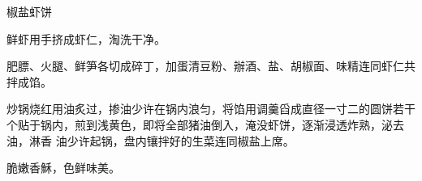 \begin{recipe}{椒盐虾饼}

\ingredients


\preparation

\step 鲜虾用手挤成虾仁，淘洗干净。

\step 肥膘、火腿、鲜笋各切成碎丁，加蛋清豆粉、辦酒、盐、胡椒面、味精连同虾仁共
拌成馅。

\step 炒锅烧红用油炙过，掺油少许在锅内浪匀，将馅用调羹舀成直径一寸二的圆饼若干
个贴于锅内，煎到浅黄色，即将全部猪油倒入，淹没虾饼，逐渐浸透炸熟，泌去油，淋香
油少许起锅，盘内镶拌好的生菜连同椒盐上席。

\features

脆嫩香穌，色鲜味美。

\end{recipe}

